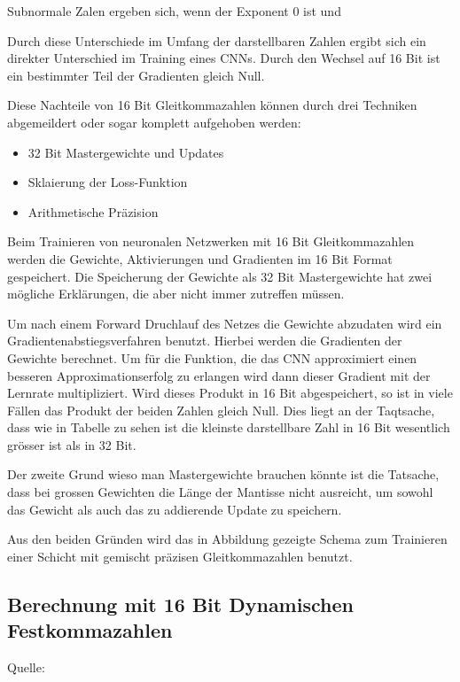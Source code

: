 Subnormale Zalen ergeben sich, wenn der Exponent 0 ist und 

Durch diese Unterschiede im Umfang der darstellbaren Zahlen ergibt sich ein direkter Unterschied im Training eines CNNs. Durch den Wechsel auf 16 Bit ist ein bestimmter Teil der Gradienten gleich Null. 

Diese Nachteile von 16 Bit Gleitkommazahlen können durch drei Techniken abgemeildert oder sogar komplett aufgehoben werden:
\begin{itemize}
 \item 32 Bit Mastergewichte und Updates
 \item Sklaierung der Loss-Funktion
 \item Arithmetische Präzision 
\end{itemize}

Beim Trainieren von neuronalen Netzwerken mit 16 Bit Gleitkommazahlen werden die Gewichte, Aktivierungen und Gradienten im 16 Bit Format gespeichert. Die Speicherung der Gewichte als 32 Bit Mastergewichte hat zwei mögliche Erklärungen, die aber nicht immer zutreffen müssen. 

Um nach einem Forward Druchlauf des Netzes die Gewichte abzudaten wird ein Gradientenabstiegsverfahren benutzt. Hierbei werden die Gradienten der Gewichte berechnet. Um für die Funktion, die das CNN approximiert einen besseren Approximationserfolg zu erlangen wird dann dieser Gradient mit der Lernrate multipliziert. Wird dieses Produkt in 16 Bit abgespeichert, so ist in viele Fällen das Produkt der beiden Zahlen gleich Null. Dies liegt an der Taqtsache, dass wie in Tabelle  zu sehen ist die kleinste darstellbare Zahl in 16 Bit wesentlich grösser ist als in 32 Bit.


Der zweite Grund wieso man Mastergewichte brauchen könnte ist die Tatsache, dass bei grossen Gewichten die Länge der Mantisse nicht ausreicht, um sowohl das Gewicht als auch das zu  addierende Update zu speichern.

Aus den beiden Gründen wird das in Abbildung  gezeigte Schema zum Trainieren einer Schicht mit gemischt präzisen Gleitkommazahlen benutzt.




\subsection{Berechnung mit 16 Bit Dynamischen Festkommazahlen}


Quelle: \cite{FPGpu}
